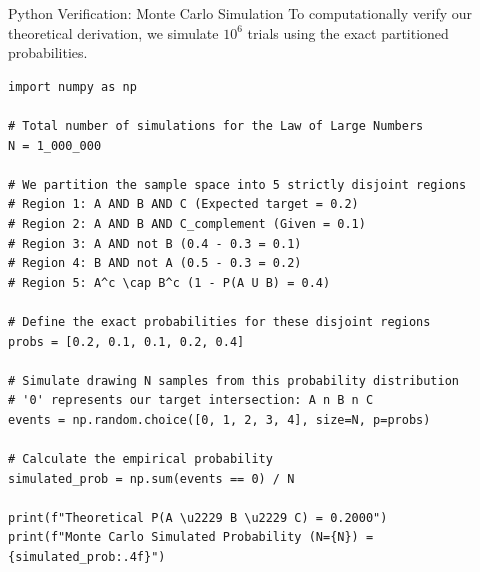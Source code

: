 \documentclass{beamer}
\begin{document}
\begin{frame}[fragile]{Python Verification: Monte Carlo Simulation}
    To computationally verify our theoretical derivation, we simulate $10^6$ trials using the exact partitioned probabilities.
\begin{lstlisting}
import numpy as np

# Total number of simulations for the Law of Large Numbers
N = 1_000_000

# We partition the sample space into 5 strictly disjoint regions
# Region 1: A AND B AND C (Expected target = 0.2)
# Region 2: A AND B AND C_complement (Given = 0.1)
# Region 3: A AND not B (0.4 - 0.3 = 0.1)
# Region 4: B AND not A (0.5 - 0.3 = 0.2)
# Region 5: A^c \cap B^c (1 - P(A U B) = 0.4)

# Define the exact probabilities for these disjoint regions
probs = [0.2, 0.1, 0.1, 0.2, 0.4]

# Simulate drawing N samples from this probability distribution
# '0' represents our target intersection: A n B n C
events = np.random.choice([0, 1, 2, 3, 4], size=N, p=probs)

# Calculate the empirical probability
simulated_prob = np.sum(events == 0) / N

print(f"Theoretical P(A \u2229 B \u2229 C) = 0.2000")
print(f"Monte Carlo Simulated Probability (N={N}) = {simulated_prob:.4f}")
\end{lstlisting}
\end{frame}
\end{document}
